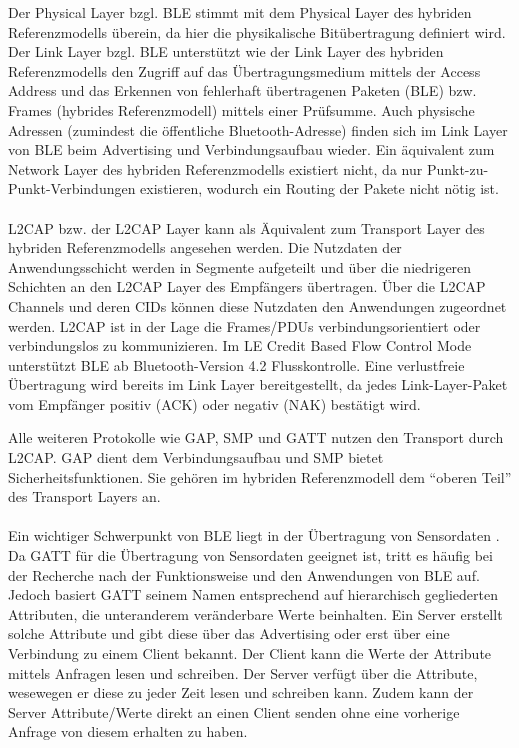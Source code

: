 Der Physical Layer bzgl. BLE stimmt mit dem Physical Layer des hybriden Referenzmodells überein, da hier die physikalische Bitübertragung definiert wird. Der Link Layer bzgl. BLE unterstützt wie der Link Layer des hybriden Referenzmodells den Zugriff auf das Übertragungsmedium mittels der Access Address und das Erkennen von fehlerhaft übertragenen Paketen (BLE) bzw. Frames (hybrides Referenzmodell) mittels einer Prüfsumme. Auch physische Adressen (zumindest die öffentliche Bluetooth-Adresse) finden sich im Link Layer von BLE beim Advertising und Verbindungsaufbau wieder. Ein äquivalent zum Network Layer des hybriden Referenzmodells existiert nicht, da nur Punkt-zu-Punkt-Verbindungen existieren, wodurch ein Routing der Pakete nicht nötig ist.
\\\\
L2CAP bzw. der L2CAP Layer kann als Äquivalent zum Transport Layer des hybriden Referenzmodells angesehen werden. Die Nutzdaten der Anwendungsschicht werden in Segmente aufgeteilt und über die niedrigeren Schichten an den L2CAP Layer des Empfängers übertragen. Über die L2CAP Channels und deren CIDs können diese Nutzdaten den Anwendungen zugeordnet werden. L2CAP ist in der Lage die Frames/PDUs verbindungsorientiert oder verbindungslos zu kommunizieren. Im LE Credit Based Flow Control Mode unterstützt BLE ab Bluetooth-Version 4.2 Flusskontrolle. Eine verlustfreie Übertragung wird bereits im Link Layer bereitgestellt, da jedes Link-Layer-Paket vom Empfänger positiv (ACK) oder negativ (NAK) bestätigt wird.

Alle weiteren Protokolle wie GAP, SMP und GATT nutzen den Transport durch L2CAP. GAP dient dem Verbindungsaufbau und SMP bietet Sicherheitsfunktionen. Sie gehören im hybriden Referenzmodell dem "`oberen Teil"' des Transport Layers an.
\\\\
Ein wichtiger Schwerpunkt von BLE liegt in der Übertragung von Sensordaten \cite{BtDataTransfer}. Da GATT für die Übertragung von Sensordaten geeignet ist, tritt es häufig bei der Recherche nach der Funktionsweise und den Anwendungen von BLE auf. Jedoch basiert GATT seinem Namen entsprechend auf hierarchisch gegliederten Attributen, die unteranderem veränderbare Werte beinhalten. Ein Server erstellt solche Attribute und gibt diese über das Advertising oder erst über eine Verbindung zu einem Client bekannt. Der Client kann die Werte der Attribute mittels Anfragen lesen und schreiben. Der Server verfügt über die Attribute, wesewegen er diese zu jeder Zeit lesen und schreiben kann. Zudem kann der Server Attribute/Werte direkt an einen Client senden ohne eine vorherige Anfrage von diesem erhalten zu haben. 

